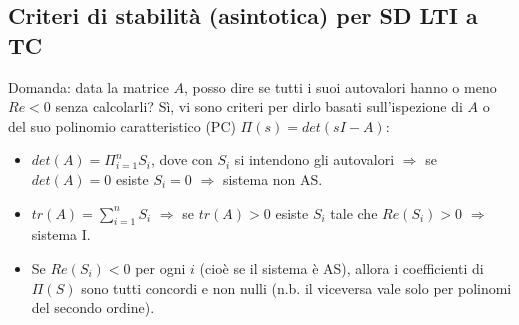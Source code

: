 \subsection{Criteri di stabilità (asintotica) per SD LTI a TC}
Domanda: data la matrice $A$, posso dire se tutti i suoi autovalori hanno o meno $Re <0$ senza calcolarli?\newline
\newline
Sì, vi sono criteri per dirlo basati sull'ispezione di $A$ o del suo polinomio caratteristico (PC) $\Pi(s) = det (sI-A)$:
\begin{itemize}
    \item $det(A) = \Pi_{i=1}^{n}S_i$, dove con $S_i$ si intendono gli autovalori $\Longrightarrow$ se $det(A) = 0$ esiste $S_i = 0$ $\Longrightarrow$ sistema non AS.
    \item $tr(A) = \sum_{i=1}^{n}S_i$ $\Longrightarrow$ se $tr(A) >0$ esiste $S_i$ tale che $Re(S_i) > 0$ $\Longrightarrow$ sistema I.
    \item Se $Re(S_i)<0$ per ogni $i$ (cioè se il sistema è AS), allora i coefficienti di $\Pi(S)$ sono tutti concordi e non nulli (n.b. il viceversa vale solo per polinomi del secondo ordine).
\end{itemize}
\ \newline